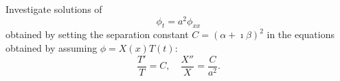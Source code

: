 {\begin{Exercise}
\end{Exercise}






\begin{Exercise}
  \label{exercise separation pt=a2pxx}
  Investigate solutions of 
  \[
  \phi_t = a^2 \phi_{x x}
  \]
  obtained by setting the separation constant $C = (\alpha + \imath \beta)^2$
  in the equations obtained by assuming $\phi = X(x) T(t)$:
  \[
  \frac{T'}{T} = C, \quad
  \frac{X''}{X} = \frac{C}{a^2}.
  \]

\end{Exercise}










\raggedbottom
}
